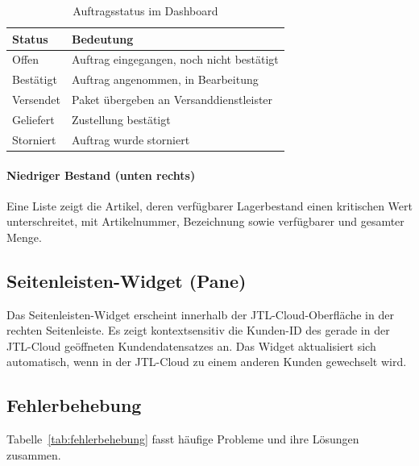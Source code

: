 \documentclass[11pt, a4paper, oneside]{report}
\begin{document}
\begin{table}[H]
  \centering
  \caption{Auftragsstatus im Dashboard}
  \label{tab:auftragsstatus}
  \begin{tabularx}{0.65\textwidth}{l X}
    \toprule
    \textbf{Status} & \textbf{Bedeutung} \\
    \midrule
    Offen       & Auftrag eingegangen, noch nicht bestätigt \\
    Bestätigt   & Auftrag angenommen, in Bearbeitung \\
    Versendet   & Paket übergeben an Versanddienstleister \\
    Geliefert   & Zustellung bestätigt \\
    Storniert   & Auftrag wurde storniert \\
    \bottomrule
  \end{tabularx}
\end{table}

\paragraph{Niedriger Bestand (unten rechts)}
Eine Liste zeigt die Artikel, deren verfügbarer Lagerbestand einen kritischen Wert
unterschreitet, mit Artikelnummer, Bezeichnung sowie verfügbarer und gesamter Menge.

\subsection*{Seitenleisten-Widget (Pane)}

Das Seitenleisten-Widget erscheint innerhalb der JTL-Cloud-Oberfläche in der
rechten Seitenleiste. Es zeigt kontextsensitiv die Kunden-ID des gerade in der
JTL-Cloud geöffneten Kundendatensatzes an. Das Widget aktualisiert sich automatisch,
wenn in der JTL-Cloud zu einem anderen Kunden gewechselt wird.

\subsection*{Fehlerbehebung}

Tabelle~\ref{tab:fehlerbehebung} fasst häufige Probleme und ihre Lösungen zusammen.
\end{document}

